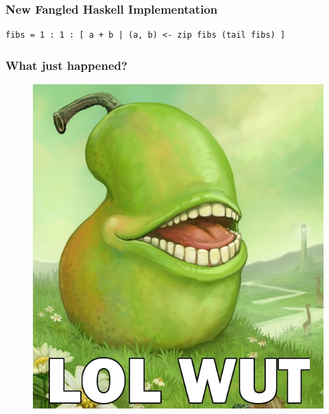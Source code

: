 \documentclass{beamer}
\begin{document}
    \lstset{language=Haskell}
    \begin{frame}[fragile=singleslide]
        \frametitle{New Fangled Haskell Implementation}

        \begin{lstlisting}
fibs = 1 : 1 : [ a + b | (a, b) <- zip fibs (tail fibs) ]
        \end{lstlisting}
    \end{frame}

    \begin{frame}[fragile=singleslide]
        \frametitle{What just happened?}

        \begin{figure}
            \centering
            \includegraphics[scale=0.35]{./fibs/images/lolwutpear.jpg}
        \end{figure}
    \end{frame}
\end{document}
